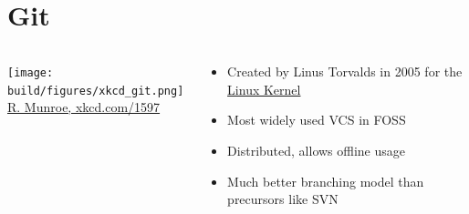 \section{Git}
\begin{frame}[c]
    \begin{columns}[onlytextwidth, c]%
      \begin{column}{0.3\textwidth}%
        \texttt{[image: build/figures/xkcd\_git.png]}\\%
        \small \href{https://xkcd.com/1597/}{R. Munroe, xkcd.com/1597}
      \end{column}%
      \hfill%
      \begin{column}{0.695\textwidth}%
        \begin{itemize}
          \item Created by Linus Torvalds in 2005 for the \href{https://github.com/torvalds/linux}{Linux Kernel}
          \item Most widely used VCS in FOSS
          \item Distributed, allows offline usage
          \item Much better branching model than precursors like SVN
        \end{itemize}
      \end{column}%
    \end{columns}%
\end{frame}

